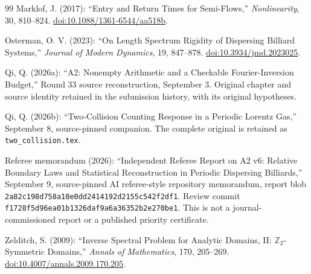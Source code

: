 \begin{thebibliography}{99}
Marklof, J. (2017): ``Entry and Return Times for Semi-Flows,'' \emph{Nonlinearity}, 30, 810--824. \href{https://doi.org/10.1088/1361-6544/aa518b}{doi:10.1088/1361-6544/aa518b}.

Osterman, O. V. (2023): ``On Length Spectrum Rigidity of Dispersing Billiard Systems,'' \emph{Journal of Modern Dynamics}, 19, 847--878. \href{https://doi.org/10.3934/jmd.2023025}{doi:10.3934/jmd.2023025}.

Qi, Q. (2026a): ``A2: Nonempty Arithmetic and a Checkable Fourier-Inversion Budget,'' Round 33 source reconstruction, September 3. Original chapter and source identity retained in the submission history, with its original hypotheses.

Qi, Q. (2026b): ``Two-Collision Counting Response in a Periodic Lorentz Gas,'' September 8, source-pinned companion. The complete original is retained as \texttt{two\_collision.tex}.

Referee memorandum (2026): ``Independent Referee Report on A2 v6: Relative Boundary Laws and Statistical Reconstruction in Periodic Dispersing Billiards,'' September 9, source-pinned AI referee-style repository memorandum, report blob \texttt{2a82c198d758a10e0dd2414192d2155c542f2df1}. Review commit \texttt{f1728f5d96ea01b1326daf9a6a36352b2e270be1}. This is not a journal-commissioned report or a published priority certificate.

Zelditch, S. (2009): ``Inverse Spectral Problem for Analytic Domains, II: $\mathbb Z_2$-Symmetric Domains,'' \emph{Annals of Mathematics}, 170, 205--269. \href{https://doi.org/10.4007/annals.2009.170.205}{doi:10.4007/annals.2009.170.205}.
\end{thebibliography}
